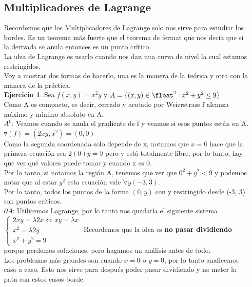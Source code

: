 \documentclass[10pt,a4paper]{article}
\begin{document}
\subsection*{Multiplicadores de Lagrange}
\label{subsec:multiplicadores_lagrange}
Recordemos que los Multiplicadores de Lagrange solo nos sirve para estudiar los bordes. Es un teorema más fuerte que el teorema de fermat que nos decía que si la derivada se anula entonces es un punto crítico. \\
La idea de Lagrange es usarlo cuando nos dan una curva de nivel la cual estamos restringidos. \\
Voy a mostrar dos formas de hacerlo, una es la manera de la teórica y otra con la manera de la práctica. \\

\textbf{Ejercicio 1}. Sea $f(x,y) = x^{2}y$ y $A = \{(x,y) \in \float^{2} : x^{2}+y^{2} \le 9\}$ \\
Como A es compacto, es decir, cerrado y acotado por Weierstrass f alcanza máximo y mínimo absoluto en A. \\
$A^{0}$: Veamos cuando se anula el gradiente de f y veamos si esos puntos están en A. \\
$\triangledown(f) = (2xy, x^{2}) = (0, 0)$ \\
Como la segunda coordenada solo depende de x, notamos que $x=0$ hace que la primera ecuación sea $2(0) y = 0$ pero y está totalmente libre, por lo tanto, hay que ver qué valores puede tomar y cuando x es 0. \\
Por lo tanto, si notamos la región A, tenemos que ver que $0^{2} + y^{2} < 9$ y podemos notar que al estar $y^{2}$ esta ecuación vale $\forall y (-3, 3)$. \\
Por lo tanto, todos los puntos de la forma $(0, y)$ con y restringido desde (-3, 3) son puntos críticos. \\
$\partial A$: Utilicemos Lagrange, por lo tanto nos quedaría el siguiente sistema \\
$\begin{cases}
   2xy = \lambda 2x \iff xy = \lambda x \\ 
   x^{2} = \lambda 2y \\
   x^{2} + y^{2} = 9
\end{cases}$ 
Recordemos que la idea es \textbf{no pasar dividiendo} porque perdemos soluciones, pero hagamos un análisis antes de todo. \\
Los problemas más grandes son cuando $x = 0$ o $y = 0$, por lo tanto analicemos caso a caso. Esto nos sirve para después poder pasar dividiendo y no meter la pata con estos casos borde. \\
\end{document}
